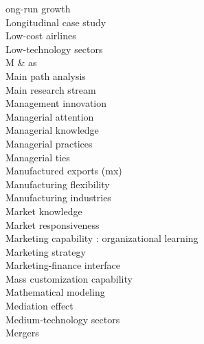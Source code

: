\documentclass[a4paper]{article}
\begin{document}
\begin{multicols*}{2}
\begin{footnotesize}
ong-run growth \\ Longitudinal case study \\ Low-cost airlines \\ Low-technology sectors \\ M \& as \\ Main path analysis \\ Main research stream \\ Management innovation \\ Managerial attention \\ Managerial knowledge \\ Managerial practices \\ Managerial ties \\ Manufactured exports (mx) \\ Manufacturing flexibility \\ Manufacturing industries \\ Market knowledge \\ Market responsiveness \\ Marketing capability : organizational learning \\ Marketing strategy \\ Marketing-finance interface \\ Mass customization capability \\ Mathematical modeling \\ Mediation effect \\ Medium-technology sectors \\ Mergers
\end{footnotesize}
\end{multicols*}
\end{document}

